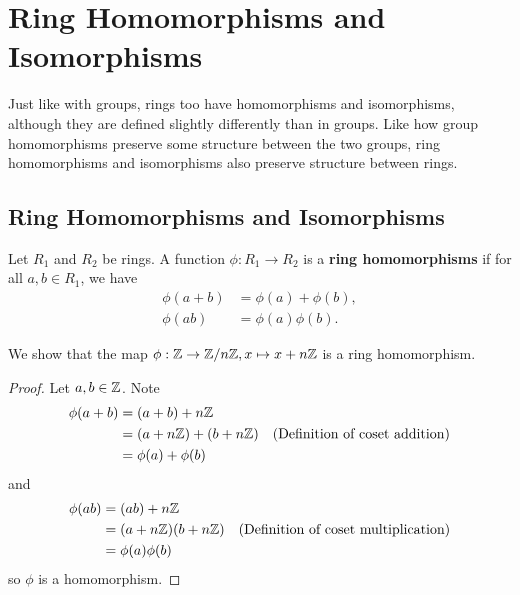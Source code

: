 \chapter{Ring Homomorphisms and Isomorphisms}
Just like with groups, rings too have homomorphisms and isomorphisms, although they are defined slightly differently than in groups. Like how group homomorphisms preserve some structure between the two groups, ring homomorphisms and isomorphisms also preserve structure between rings.

\section{Ring Homomorphisms and Isomorphisms}
\begin{definition}
    Let $R_1$ and $R_2$ be rings. A function $\phi: R_1 \to R_2$ is a \textbf{ring homomorphisms} if for all $a, b \in R_1$, we have
    \begin{align*}
        \phi(a+b) &= \phi(a) + \phi(b),\\
        \phi(ab) &= \phi(a)\phi(b).
    \end{align*}
\end{definition}

\begin{example}
     We show that the map $\phi: \mathbb{Z} \to \mathbb{Z}/n\mathbb{Z}, x \mapsto x + n\mathbb{Z}$ is a ring homomorphism.
     
     \begin{proof}
        Let $a, b \in \mathbb{Z}$. Note
        \begin{align*}
            \phi(a+b) &= (a+b) + n\mathbb{Z}\\
            &= (a + n\mathbb{Z}) + (b + n\mathbb{Z}) & (\text{Definition of coset addition})\\
            &=\phi(a)+\phi(b)
        \end{align*}
        and
        \begin{align*}
            \phi(ab) &= (ab) + n\mathbb{Z}\\
            &= (a + n\mathbb{Z})(b + n\mathbb{Z}) & (\text{Definition of coset multiplication})\\
            &= \phi(a)\phi(b)
        \end{align*}
        so $\phi$ is a homomorphism.
     \end{proof}
\end{example}

